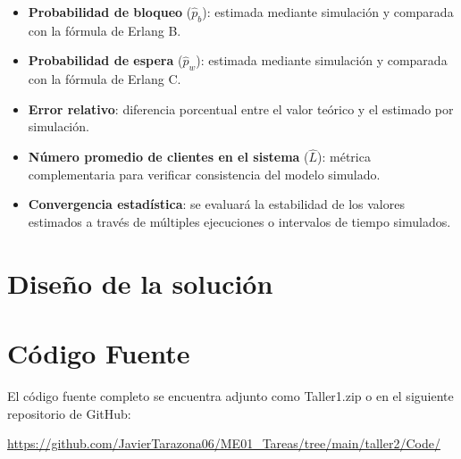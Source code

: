\documentclass{article}
\begin{document}
\begin{itemize}
    \item \textbf{Probabilidad de bloqueo} ($\hat{p}_b$): estimada mediante simulación y comparada con la fórmula de Erlang B.
    \item \textbf{Probabilidad de espera} ($\hat{p}_w$): estimada mediante simulación y comparada con la fórmula de Erlang C.
    \item \textbf{Error relativo}: diferencia porcentual entre el valor teórico y el estimado por simulación.
    \item \textbf{Número promedio de clientes en el sistema} ($\hat{L}$): métrica complementaria para verificar consistencia del modelo simulado.
    \item \textbf{Convergencia estadística}: se evaluará la estabilidad de los valores estimados a través de múltiples ejecuciones o intervalos de tiempo simulados.
\end{itemize}





\section{Diseño de la solución}\label{sec:disSol}



\section{Código Fuente}\label{sec:cod}

El código fuente completo se encuentra adjunto como Taller1.zip
o en el siguiente repositorio de GitHub:

\begin{center}
\url{https://github.com/JavierTarazona06/ME01_Tareas/tree/main/taller2/Code/}
\end{center}


\end{document}
